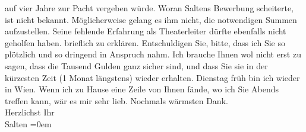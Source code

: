 \begin{ledgroupsized}[t]{13cm}
{{{                     auf vier Jahre zur Pacht vergeben würde. Woran Saltens 
                     Bewerbung scheiterte, ist nicht bekannt. Möglicherweise gelang es ihm nicht, die
                  notwendigen Summen aufzustellen. Seine fehlende Erfahrung als Theaterleiter dürfte ebenfalls
                  nicht geholfen haben.}}}\label{K_L03291-1h} brieflich zu erklären. Entschuldigen Sie,
               bitte, dass ich Sie so plötzlich und so dringend in Anspruch nahm. Ich brauche Ihnen
               wol nicht erst zu sagen, dass die Tausend Gulden ganz sicher sind, und dass Sie sie
               in der kürzesten Zeit (1 Monat längstens) wieder erhalten. \pend
           \pstart
           Dienstag früh bin ich wieder in Wien. Wenn ich zu Hause eine Zeile von Ihnen fände, wo ich Sie Abends {\pb}treffen kann, wär es mir sehr lieb.\pend
           \pstart
           Nochmals wärmsten Dank.{\\[\baselineskip]}Herzlichst Ihr{\\[\baselineskip]}\spacefill\mbox{Salten}\pend
           \leftskip=0em{}
         
         \endnumbering{}\end{ledgroupsized}\begin{anhang}\end{anhang}\newcommand{\dateiname}{L03291}\newcommand{\titel}{Felix Salten an Arthur Schnitzler, 6. 9. 1899}\newcommand{\editorInnen}{Martin Anton Müller und Laura Untner}
      